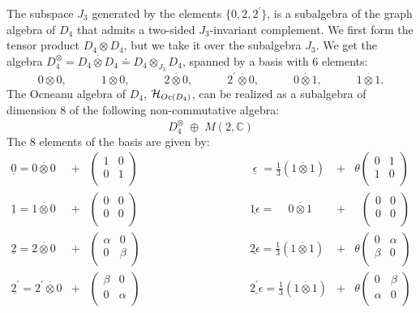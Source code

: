 \documentclass[a4paper,11pt]{article}
\def \otimesdot {\stackrel{\cdot}{\otimes}}
\begin{document}
The subspace $J_3$ generated by the elements $\{ 0, 2, 2^{'} \}$, is a
subalgebra of the graph algebra of $D_4$ that admits a two-sided
$J_3$-invariant complement.
We first form the tensor product $D_4 \otimes D_4$, but we take it over
the subalgebra $J_3$.
We get the algebra $D_4^{\otimesdot} = D_4 \otimesdot D_4 \doteq
D_4 \otimes_{J_3} D_4$,
spanned by a basis with 6 elements:
$$
0 \otimesdot 0, \qquad \quad 1 \otimesdot 0, \qquad \quad  2 \otimesdot 0,
\qquad \quad  2^{'} \otimesdot 0, \qquad \quad 0 \otimesdot 1, \qquad \quad
1 \otimesdot 1.
$$
The Ocneanu algebra of $D_4$, ${\cal H}_{Oc(D_4)}$, can be realized as
a subalgebra of dimension 8 of the following non-commutative algebra:
$$
D_4^{\otimesdot} \; \oplus \; M(2,\mathbb{C})
$$
The 8 elements of the basis are given by:
$$
\begin{array}{cccclcc}
\underline{0} = 0     \otimesdot 0 &+&
\left( \begin{array}{cc} 1 & 0 \\ 0 & 1 \\ \end{array} \right)
& \qquad \qquad \qquad \qquad&
\; \underline{\epsilon} \; = \frac{1}{3} (1 \otimesdot 1) &+&
\theta \left( \begin{array}{cc} 0 & 1 \\ 1 & 0 \\ \end{array} \right)\\
\underline{1}         = 1     \otimesdot 0 &+&
\left( \begin{array}{cc} 0 & 0 \\ 0 & 0 \\ \end{array} \right)
& {} &
\underline{1\epsilon} = \quad \, 0     \otimesdot 1 &+&
\; \; \left( \begin{array}{cc} 0 & 0 \\ 0 & 0 \\ \end{array} \right) \\
\underline{2}         = 2     \otimesdot 0 &+&
\left( \begin{array}{cc} \alpha & 0 \\ 0 & \beta \\ \end{array} \right)
& {} &
\underline{2\epsilon} = \frac{1}{3} (1 \otimesdot 1) &+&
\theta \left( \begin{array}{cc} 0 & \alpha \\ \beta & 0 \\
\end{array} \right) \\
\underline{2^{'}}     = 2^{'} \otimesdot 0 &+&
\left( \begin{array}{cc} \beta & 0 \\ 0 & \alpha \\ \end{array} \right)
& {} &
\underline{2^{'}\epsilon} = \frac{1}{3}(1 \otimesdot 1) &+&
\theta \left( \begin{array}{cc} 0 & \beta \\ \alpha & 0 \\ \end{array} \right)
\end{array}
$$
\end{document}
